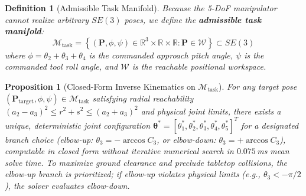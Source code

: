 \documentclass[journal]{IEEEtran}
\newtheorem{proposition}{Proposition}
\newtheorem{definition}{Definition}
\begin{document}
\begin{definition}[Admissible Task Manifold]
Because the 5-DoF manipulator cannot realize arbitrary $SE(3)$ poses, we define the \textbf{admissible task manifold}:
\begin{equation}
\mathcal{M}_{\text{task}} = \left\{ (\mathbf{P}, \phi, \psi) \in \mathbb{R}^3 \times \mathbb{R} \times \mathbb{R} : \mathbf{P} \in \mathcal{W} \right\} \subset SE(3)
\end{equation}
where $\phi = \theta_2 + \theta_3 + \theta_4$ is the commanded approach pitch angle, $\psi$ is the commanded tool roll angle, and $\mathcal{W}$ is the reachable positional workspace.
\end{definition}

\begin{proposition}[Closed-Form Inverse Kinematics on $\mathcal{M}_{\text{task}}$]
\label{prop_ik}
For any target pose $(\mathbf{P}_{\text{target}}, \phi, \psi) \in \mathcal{M}_{\text{task}}$ satisfying radial reachability $(a_2 - a_3)^2 \le r^2 + s^2 \le (a_2 + a_3)^2$ and physical joint limits, there exists a unique, deterministic joint configuration $\boldsymbol{\theta}^* = [\theta_1^*, \theta_2^*, \theta_3^*, \theta_4^*, \theta_5^*]^T$ for a designated branch choice (elbow-up: $\theta_3 = -\arccos C_3$, or elbow-down: $\theta_3 = +\arccos C_3$), computable in closed form without iterative numerical search in $0.075$\,ms mean solve time. To maximize ground clearance and preclude tabletop collisions, the elbow-up branch is prioritized; if elbow-up violates physical limits (e.g., $\theta_3 < -\pi/2$), the solver evaluates elbow-down.
\end{proposition}
\end{document}
